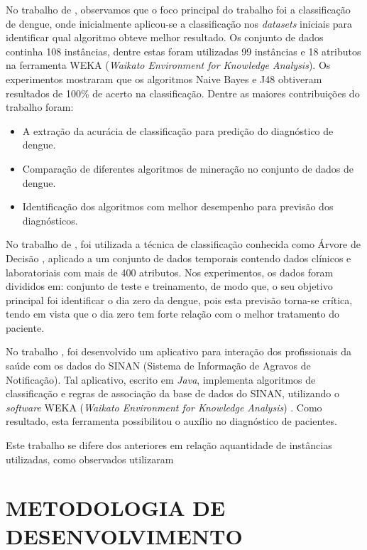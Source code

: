 \documentclass[
	12pt,				%
	openright,			%
	oneside,	
	a4paper,				%
	english,				%
	brazil				%
]{abntex2/abntex2} %
\begin{document}
	No trabalho de \cite{shakil:2015}, observamos que o foco principal do trabalho foi a classificação de dengue, onde inicialmente aplicou-se a classificação nos \textit{datasets} iniciais para identificar qual algoritmo obteve melhor resultado. Os conjunto de dados continha 108 instâncias, dentre estas foram utilizadas 99 instâncias e  18 atributos na ferramenta WEKA (\textit{Waikato Environment for Knowledge Analysis}). Os experimentos mostraram que os algoritmos Naive Bayes e J48 obtiveram resultados de 100\% de acerto na classificação. Dentre as maiores contribuições do trabalho foram:
	
	\begin{itemize}
		\item A extração da acurácia de classificação para predição do diagnóstico de dengue.
		\item Comparação de diferentes algoritmos de mineração no conjunto de dados de dengue.
		\item Identificação dos algoritmos com melhor desempenho para previsão dos diagnósticos.
	\end{itemize}
	
	No trabalho de \cite{thitiprayoonwongse:2012}, foi utilizada a técnica de classificação conhecida como Árvore de Decisão \cite{tan:2009}, aplicado a um conjunto de dados temporais contendo dados clínicos e laboratoriais com mais de 400 atributos. Nos experimentos, os dados foram divididos em: conjunto de teste e treinamento, de modo que, o seu objetivo principal foi identificar o dia zero da dengue, pois esta previsão torna-se crítica, tendo em vista que o dia zero tem forte relação com o melhor tratamento do paciente.
	
	No trabalho \cite{santos:2011}, foi desenvolvido um aplicativo para interação dos profissionais da saúde com os dados do SINAN (Sistema de Informação de Agravos de Notificação). Tal aplicativo, escrito em  \textit{Java}\cite{oracle:2015}, implementa algoritmos de classificação e regras de associação da base de dados do SINAN, utilizando o \textit{software} WEKA (\textit{Waikato Environment for Knowledge Analysis}) \cite{weka:2015}. Como resultado, esta ferramenta possibilitou o auxílio no diagnóstico de pacientes.
	
	Este trabalho se difere dos anteriores em relação aquantidade de instâncias utilizadas, como observados utilizaram 

	\section{METODOLOGIA DE DESENVOLVIMENTO}
		
\end{document}
